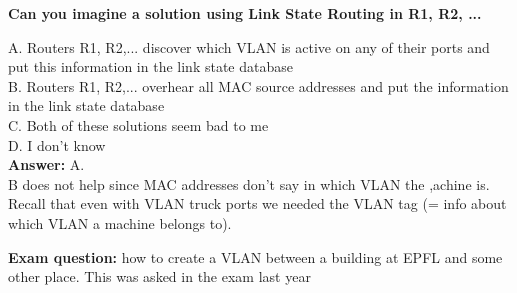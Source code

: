 \documentclass[11pt]{article}
\begin{document}
\begin{tcolorbox}[
  colback=gray!15,     %
  colframe=black!50,    %
  boxrule=1pt,       %
  arc=3mm,             %
  left=4mm, right=4mm, top=2mm, bottom=2mm %
]
\textbf{Can you imagine a solution using Link State Routing in R1, R2, ...}

\vspace{0.3cm}

A. Routers R1, R2,... discover which VLAN is active on any of their ports and put this information in the link state database \\
B. Routers R1, R2,... overhear all MAC source addresses and put the information in the link state database \\
C. Both of these solutions seem bad to me \\
D. I don't know \\

\textbf{Answer:} A. \\
B does not help since MAC addresses don't say in which VLAN the ,achine is. Recall that even with VLAN truck ports we needed the VLAN tag (= info about which VLAN a machine belongs to).
\end{tcolorbox}
\textbf{Exam question:} how to create a VLAN between a building at EPFL and some other place. This was asked in the exam last year
\end{document}
